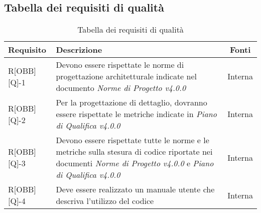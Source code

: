 \subsection{Tabella dei requisiti di qualità}

\begin{center}
	\begin{table}[h]
	\begin{tabular}{|l|p{}|c|}
		\toprule
		
		\textbf{Requisito} & \textbf{Descrizione} & \textbf{Fonti} \\
		
		\midrule
		R[OBB][Q]-1 & Devono essere rispettate le norme di progettazione architetturale indicate nel documento \textit{Norme di Progetto v4.0.0} & Interna \\ \midrule
		R[OBB][Q]-2 & Per la progettazione di dettaglio, dovranno essere rispettate le metriche indicate in \textit{Piano di Qualifica v4.0.0} & Interna \\ \midrule
		R[OBB][Q]-3 & Devono essere rispettate tutte le norme e le metriche sulla stesura di codice riportate nei documenti \textit{Norme di Progetto v4.0.0} e \textit{Piano di Qualifica v4.0.0} & Interna \\ \midrule
		R[OBB][Q]-4 & Deve essere realizzato un manuale utente che descriva l'utilizzo del codice & Interna \\
		
		\bottomrule

	\end{tabular}
	\caption{Tabella dei requisiti di qualità}
	
	\end{table}
\end{center}
\newpage

